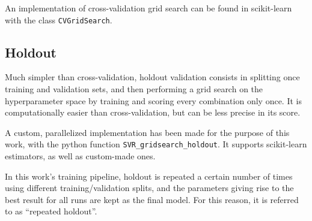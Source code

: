 \documentclass[12pt]{report}
\begin{document}
An implementation of cross-validation grid search can be found in scikit-learn with the class \texttt{CVGridSearch}.

\subsection*{Holdout}
Much simpler than cross-validation, holdout validation consists in splitting once training and validation sets, and then performing a grid search on the hyperparameter space by training and scoring every combination only once. It is computationally easier than cross-validation, but can be less precise in its score.

A custom, parallelized implementation has been made for the purpose of this work, with the python function \texttt{SVR\_gridsearch\_holdout}. It supports scikit-learn estimators, as well as custom-made ones.

In this work's training pipeline, holdout is repeated a certain number of times using different training/validation splits, and the parameters giving rise to the best result for all runs are kept as the final model. For this reason, it is referred to as ``repeated holdout''.
\end{document}
